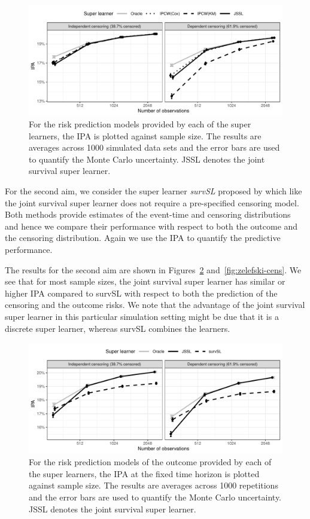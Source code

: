 \documentclass[a4paper,danish]{article}
\newcommand{\1}{\mathds{1}}
\theoremstyle{plain} %
\numberwithin{theorem}{section}
\theoremstyle{definition} %
\theoremstyle{remark}
\begin{document}
\begin{figure}[ht]
  \includegraphics[width=13cm]{experiment-fig-sl-ipcw}
  \caption{For the risk prediction models provided by each of the
    super learners, the IPA is plotted against sample size. The
    results are averages across 1000 simulated data sets and the error
    bars are used to quantify the Monte Carlo uncertainty. JSSL
    denotes the joint survival super learner. }
\label{fig:ipcw-fail}
\end{figure}
 
For the second aim, we consider the super learner {\it survSL}
proposed by \citep{westling2021inference} which like the joint
survival super learner does not require a pre-specified censoring
model. Both methods provide estimates of the event-time and censoring
distributions and hence we compare their performance with respect to
both the outcome and the censoring distribution. Again we use the IPA
to quantify the predictive performance.

The results for the second aim are shown in
Figures~\ref{fig:zelefski-out} and~\ref{fig:zelefski-cens}. We see
that for most sample sizes, the joint survival super learner has
similar or higher IPA compared to survSL with respect to both the
prediction of the censoring and the outcome risks. We note that the
advantage of the joint survival super learner in this particular
simulation setting might be due that it is a discrete super learner,
whereas survSL combines the learners.


\begin{figure}[ht]
  \includegraphics[width=13cm]{experiment-fig-sl-survSL-out}
\caption{For the risk prediction models of the outcome provided by
  each of the super learners, the IPA at the fixed time horizon is
  plotted against sample size. The results are averages across 1000
  repetitions and the error bars are used to quantify the Monte Carlo
  uncertainty. JSSL denotes the joint survival super learner.}
\label{fig:zelefski-out}
\end{figure}
\end{document}

